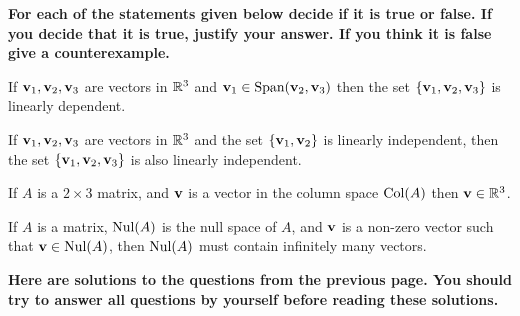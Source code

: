 \newpage

{\bf For each of the statements given below decide if it is true or false. If you decide that it is true, justify your answer. 
If you think it is false give a counterexample. }

\vskip 10mm

\benu
\item[\bf a)] If ${\bf v}_{1}, {\bf v}_{2}, {\bf v}_{3}$ are vectors in ${\mathbb R}^{3}$ and ${\bf v}_{1} \in \text{Span}({\bf v}_{2}, {\bf v}_{3})$ then 
the set $\{{\bf v}_{1}, {\bf v}_{2}, {\bf v}_{3} \}$ is linearly dependent. 

\vskip 10mm

\item[\bf b)] If ${\bf v}_{1}, {\bf v}_{2}, {\bf v}_{3}$ are vectors in ${\mathbb R}^{3}$ and the set $\{{\bf v}_{1}, {\bf v}_{2}\}$ is linearly independent, 
then the set $\{{\bf v}_{1}, {\bf v}_{2}, {\bf v}_{3}\}$ is also linearly independent.  


\vskip 10mm

\item[\bf c)]  If $A$ is a $2\times 3$ matrix, and ${\bf v}$ is a vector in the column space $\text{Col}(A)$ then ${\bf v}\in {\mathbb R}^{3}$.

\vskip 10mm

\item[\bf d)]  If $A$ is a matrix, $\text{Nul}(A)$ is the null space of $A$, and ${\bf v}$ is a non-zero vector such that 
${\bf v}\in\text{Nul}(A)$, then $\text{Nul}(A)$ must contain infinitely many vectors. 


\eenu


\newpage

{\bf Here are solutions to the questions from the previous page. You should try to answer all 
questions by yourself before reading these solutions.}

\vskip 5mm 

